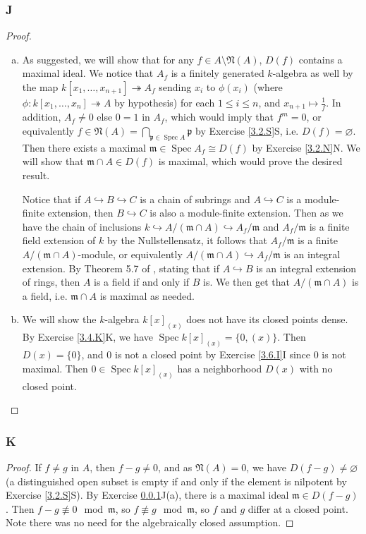 \documentclass{article}
\newcommand{\frkm}{\mathfrak{m}}
\newcommand{\frkp}{\mathfrak{p}}
\newcommand{\frkN}{\mathfrak{N}}
\DeclareMathOperator{\Spec}{\mathrm{Spec}}
\let\emptyset\varnothing
\theoremstyle{definition} %
\begin{document}
\subsubsection{J}\label{3.6.J}
\begin{proof}
    \begin{enumerate}[(a)]
        \item As suggested, we will show that for any $f\in A\setminus \frkN(A)$, $D(f)$ contains a maximal ideal. We notice that $A_f$ is a finitely generated $k$-algebra as well by the map $k[x_1,\dots,x_{n+1}]\twoheadrightarrow A_f$ sending $x_i$ to $\phi(x_i)$ (where $\phi:k[x_1,\dots,x_n]\twoheadrightarrow A$ by hypothesis) for each $1\le i \le n$, and $x_{n+1}\mapsto \frac{1}{f}$. In addition, $A_f\ne 0$ else $0=1$ in $A_f$, which would imply that $f^m=0$, or equivalently $f\in \frkN(A)=\bigcap_{\frkp \in \Spec A} \frkp$ by Exercise \ref{3.2.S}S, i.e. $D(f)=\emptyset$. Then there exists a maximal $\frkm \in \Spec A_f \cong D(f)$ by Exercise \ref{3.2.N}N. We will show that $\frkm \cap A \in D(f)$ is maximal, which would prove the desired result.
        
        Notice that if $A\hookrightarrow B \hookrightarrow C$ is a chain of subrings and $A\hookrightarrow C$ is a module-finite extension, then $B\hookrightarrow C$ is also a module-finite extension. Then as we have the chain of inclusions $k\hookrightarrow A/(\frkm \cap A) \hookrightarrow A_f/\frkm$ and $A_f/\frkm$ is a finite field extension of $k$ by the Nullstellensatz, it follows that $A_f/\frkm$ is a finite $A/(\frkm\cap A)$-module, or equivalently $A/(\frkm \cap A) \hookrightarrow A_f/\frkm$ is an integral extension. By Theorem 5.7 of \cite{Atiyah-Macdonald}, stating that if $A\hookrightarrow B$ is an integral extension of rings, then $A$ is a field if and only if $B$ is. We then get that $A/(\frkm \cap A)$ is a field, i.e. $\frkm \cap A$ is maximal as needed.
        \item We will show the $k$-algebra $k[x]_{(x)}$ does not have its closed points dense. By Exercise \ref{3.4.K}K, we have $\Spec k[x]_{(x)}=\{0, (x)\}$. Then $D(x)=\{0\}$, and $0$ is not a closed point by Exercise \ref{3.6.I}I since $0$ is not maximal. Then $0\in \Spec k[x]_{(x)}$ has a neighborhood $D(x)$ with no closed point.
    \end{enumerate}
\end{proof}
\subsubsection{K}\label{3.6.K}
\begin{proof}
    If $f \ne g$ in $A$, then $f-g\ne 0$, and as $\frkN(A)=0$, we have $D(f-g)\ne \emptyset$ (a distinguished open subset is empty if and only if the element is nilpotent by Exercise \ref{3.2.S}S). By Exercise \ref{3.6.J}J(a), there is a maximal ideal $\frkm \in D(f-g)$. Then $f-g\not \equiv 0 \mod \frkm$, so $f\not \equiv g \mod \frkm$, so $f$ and $g$ differ at a closed point. Note there was no need for the algebraically closed assumption.
\end{proof}
\end{document}
